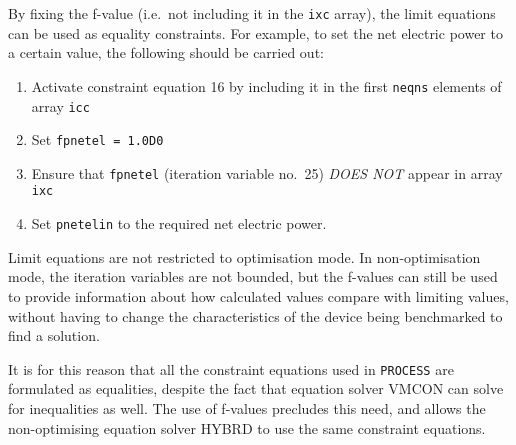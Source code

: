 \documentclass[11pt,a4paper]{report}
\newcommand{\process}{\mbox{\texttt{PROCESS}}}
\begin{document}
By fixing the f-value (i.e.\ not including it in the \texttt{ixc} array), the
limit equations can be used as equality constraints. For example, to set the
net electric power to a certain value, the following should be carried out:
\begin{enumerate}
\item Activate constraint equation 16 by including it in the first
  \texttt{neqns} elements of array \texttt{icc}
\item Set \texttt{fpnetel = 1.0D0}
\item Ensure that \texttt{fpnetel} (iteration variable no.\ 25) \textit{DOES
    NOT}\/ appear in array \texttt{ixc}
\item Set \texttt{pnetelin} to the required net electric power.
\end{enumerate}

Limit equations are not restricted to optimisation mode. In non-optimisation
mode, the iteration variables are not bounded, but the f-values can still be
used to provide information about how calculated values compare with limiting
values, without having to change the characteristics of the device being
benchmarked to find a solution.

It is for this reason that all the constraint equations used in \process\/ are
formulated as equalities, despite the fact that equation solver VMCON can
solve for inequalities as well. The use of f-values precludes this need, and
allows the non-optimising equation solver HYBRD to use the same constraint
equations.

\end{document}
